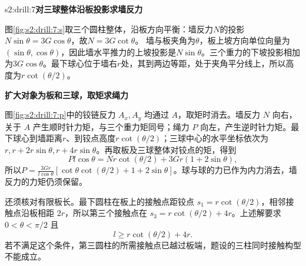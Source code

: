 \begin{drillsolution}{s2:drill:7}\textbf{对三球整体沿板投影求墙反力}\par\nobreak
图\ref{fig:s2:drill:7:s}取三个圆柱整体，沿板方向平衡：墙反力$N$的投影$N\sin\theta=3G\cos\theta$，故$N=3G\cot\theta$。
墙与板夹角为$\theta$，板上坡方向单位向量为$(\sin\theta,\cos\theta)$，因此墙水平推力的上坡投影是$N\sin\theta$。三个重力的下坡投影相加为$3G\cos\theta$。最下球心位于墙右$r$处，其到两边等距，处于夹角平分线上，所以高度为$r\cot(\theta/2)$。



\par\medskip{}\noindent\textbf{扩大对象为板和三球，取矩求绳力}\par\nobreak
图\ref{fig:s2:drill:7:p}中的铰链反力 $A_x,A_y$ 均通过 $A$，取矩时消去。墙反力 $N$ 向右，关于 $A$ 产生顺时针力矩，与三个重力矩同号；绳力 $P$ 向左，产生逆时针力矩。最下球心到墙距离$r$、到铰点高度$r\cot(\theta/2)$；三球中心的水平坐标依次为$r,r+2r\sin\theta,r+4r\sin\theta$。再取板及三球整体对铰点的矩，得到
\[
Pl\cos\theta=Nr\cot(\theta/2)+3Gr(1+2\sin\theta),
\]
所以$P=\frac{3Gr}{l\cos\theta}[\cot\theta\cot(\theta/2)+1+2\sin\theta]$。球与球的力已作为内力消去，墙反力的力矩仍须保留。

还须核对有限板长。最下圆柱在板上的接触点距铰点
$s_1=r\cot(\theta/2)$，相邻接触点沿板相距 $2r$，所以第三个接触点在
$s_3=r\cot(\theta/2)+4r$。上述解要求 $0<\theta<\pi/2$ 且
\[
l\ge r\cot(\theta/2)+4r.
\]
若不满足这个条件，第三圆柱的所需接触点已越过板端，题设的三柱同时接触构型不能成立。\end{drillsolution}
